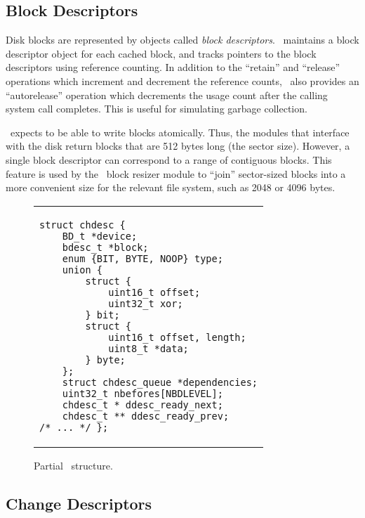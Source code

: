 
\subsection{Block Descriptors}

Disk blocks are represented by objects called \emph{block descriptors}.
\Kudos\ maintains a block descriptor object for each cached block, and tracks
pointers to the block descriptors using reference counting. In addition to the
``retain'' and ``release'' operations which increment and decrement the
reference counts, \Kudos\ also provides an ``autorelease'' operation which
decrements the usage count after the calling system call completes. This is
useful for simulating garbage collection.

\Kudos\ expects to be able to write blocks atomically. Thus, the modules that
interface with the disk return blocks that are 512 bytes long (the sector
size). However, a single block descriptor can correspond to a range of
contiguous blocks. This feature is used by the \Kudos\ block resizer module to
``join'' sector-sized blocks into a more convenient size for the relevant file
system, such as 2048 or 4096 bytes.


\begin{figure}[t]
\vskip-14pt
\begin{tabular}{@{\hskip0.58in}p{2in}@{}}
\begin{scriptsize}
\begin{verbatim}
struct chdesc {
    BD_t *device;
    bdesc_t *block;
    enum {BIT, BYTE, NOOP} type;
    union {
        struct {
            uint16_t offset;
            uint32_t xor;
        } bit;
        struct {
            uint16_t offset, length;
            uint8_t *data;
        } byte;
    };
    struct chdesc_queue *dependencies;
    uint32_t nbefores[NBDLEVEL];
    chdesc_t * ddesc_ready_next;
    chdesc_t ** ddesc_ready_prev;
/* ... */ };
\end{verbatim}
\end{scriptsize}
\end{tabular}
\vspace{-10pt}
\caption{\label{fig:chdesc} Partial \chdesc\ structure.}
\end{figure}


\subsection {Change Descriptors}
\label{sec:design:chdescs}

